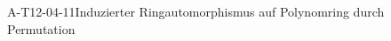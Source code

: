 
\begin{REM}{A-T12-04-11}{Induzierter Ringautomorphismus auf Polynomring durch Permutation}
\end{REM}
